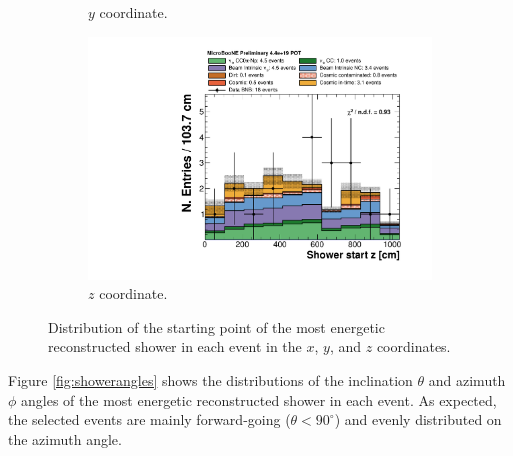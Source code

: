 \begin{figure}[htbp]
\begin{subfigure}{0.3\textwidth}
    \caption{$y$ coordinate.} 
  \end{subfigure}
  \begin{subfigure}{0.3\textwidth}
    \includegraphics[width=\linewidth]{figures/h_shower_start_z.pdf}
    \caption{$z$ coordinate.} 
  \end{subfigure}
  \caption{Distribution of the starting point of the most energetic reconstructed shower in each event in the $x$, $y$, and $z$ coordinates.}\label{fig:showerxyz}
\end{figure}

Figure \ref{fig:showerangles} shows the distributions of the inclination $\theta$ and azimuth $\phi$ angles of the most energetic reconstructed shower in each event. As expected, the selected events are mainly forward-going ($\theta < 90^{\circ}$) and evenly distributed on the azimuth angle.

